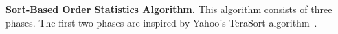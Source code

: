 
\textbf{Sort-Based Order Statistics Algorithm.} This algorithm consists of three phases. The first two phases are inspired by Yahoo's TeraSort algorithm~\cite{terasort}.







